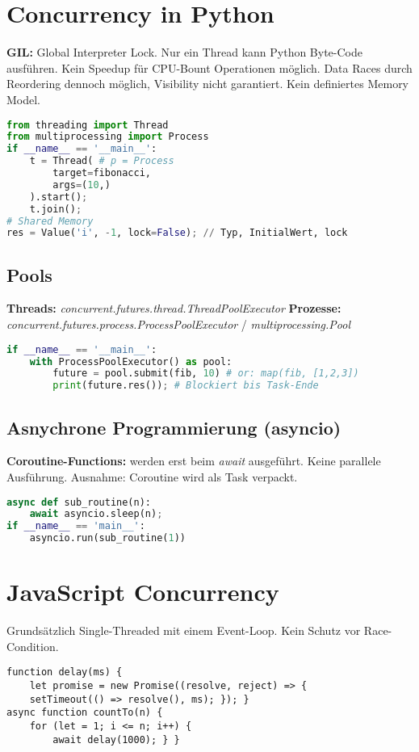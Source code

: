\section{Concurrency in Python}
\textbf{GIL:} Global Interpreter Lock. 
Nur ein Thread kann Python Byte-Code ausführen.
Kein Speedup für CPU-Bount Operationen möglich. Data Races durch Reordering dennoch möglich, Visibility nicht garantiert.
Kein definiertes Memory Model.
\begin{lstlisting}[language=python]
from threading import Thread
from multiprocessing import Process
if __name__ == '__main__':
    t = Thread( # p = Process
        target=fibonacci,
        args=(10,)
    ).start();
    t.join();
# Shared Memory
res = Value('i', -1, lock=False); // Typ, InitialWert, lock
\end{lstlisting}

\subsection{Pools}
\textbf{Threads:} \textit{concurrent.futures.thread.ThreadPoolExecutor}
\textbf{Prozesse:} \textit{concurrent.futures.process.ProcessPoolExecutor} / \textit{multiprocessing.Pool}
\begin{lstlisting}[language=python]
if __name__ == '__main__':
    with ProcessPoolExecutor() as pool:
        future = pool.submit(fib, 10) # or: map(fib, [1,2,3])
        print(future.res()); # Blockiert bis Task-Ende
\end{lstlisting}

\subsection{Asnychrone Programmierung (asyncio)}
\textbf{Coroutine-Functions:} werden erst beim \textit{await} ausgeführt.
Keine parallele Ausführung. Ausnahme: Coroutine wird als Task verpackt.
\begin{lstlisting}[language=python]
async def sub_routine(n):
    await asyncio.sleep(n);
if __name__ == 'main__':
    asyncio.run(sub_routine(1))
\end{lstlisting}


\section{JavaScript Concurrency}
Grundsätzlich Single-Threaded mit einem Event-Loop.
Kein Schutz vor Race-Condition.
\begin{lstlisting}
function delay(ms) {
    let promise = new Promise((resolve, reject) => {
    setTimeout(() => resolve(), ms); }); }
async function countTo(n) {
    for (let = 1; i <= n; i++) {
        await delay(1000); } }
\end{lstlisting}

